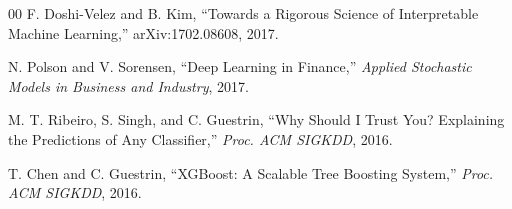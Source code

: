 \begin{thebibliography}{00}
 F. Doshi-Velez and B. Kim, ``Towards a Rigorous Science of Interpretable Machine Learning,'' arXiv:1702.08608, 2017.

 N. Polson and V. Sorensen, ``Deep Learning in Finance,'' \textit{Applied Stochastic Models in Business and Industry}, 2017.

 M. T. Ribeiro, S. Singh, and C. Guestrin, ``Why Should I Trust You? Explaining the Predictions of Any Classifier,'' \textit{Proc. ACM SIGKDD}, 2016.

 T. Chen and C. Guestrin, ``XGBoost: A Scalable Tree Boosting System,'' \textit{Proc. ACM SIGKDD}, 2016.

\end{thebibliography}

